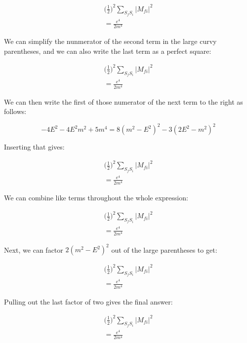 \documentclass[a4]{article}
\begin{document}
    \begin{eqnarray}
        \bigg( \frac{1}{2} \bigg)^2 \sum_{S_f S_i} |M_{f i}|^2 \\
        = \frac{e^4}{2 m^4}
    \end{eqnarray}

    We can simplify the nunmerator of the second term in the large curvy parentheses, and we can also write the last term as a perfect square:

    \begin{eqnarray}
        \bigg( \frac{1}{2} \bigg)^2 \sum_{S_f S_i} |M_{f i}|^2 \\
        = \frac{e^4}{2 m^4}
    \end{eqnarray}

    We can then write the first of those numerator of the next term to the right as follows:

    \begin{equation}
        -4 E^2 - 4E^2 m^2 + 5 m^4 = 8 (m^2 - E^2)^2 - 3(2 E^2 - m^2)^2
    \end{equation}

    Inserting that gives:

    \begin{eqnarray}
        \bigg( \frac{1}{2} \bigg)^2 \sum_{S_f S_i} |M_{f i}|^2 \\
        = \frac{e^4}{2 m^4}
    \end{eqnarray}

    We can combine like terms throughout the whole expression:

    \begin{eqnarray}
        \bigg( \frac{1}{2} \bigg)^2 \sum_{S_f S_i} |M_{f i}|^2 \\
        = \frac{e^4}{2 m^4}
    \end{eqnarray}

    Next, we can factor $2 (m^2 - E^2)^2$ out of the large parentheses to get:

    \begin{eqnarray}
        \bigg( \frac{1}{2} \bigg)^2 \sum_{S_f S_i} |M_{f i}|^2 \\
        = \frac{e^4}{2 m^4}
    \end{eqnarray}

    Pulling out the last factor of two gives the final answer:

    \begin{eqnarray}
        \bigg( \frac{1}{2} \bigg)^2 \sum_{S_f S_i} |M_{f i}|^2 \\
        = \frac{e^4}{2 m^4}
    \end{eqnarray}
\end{document}
